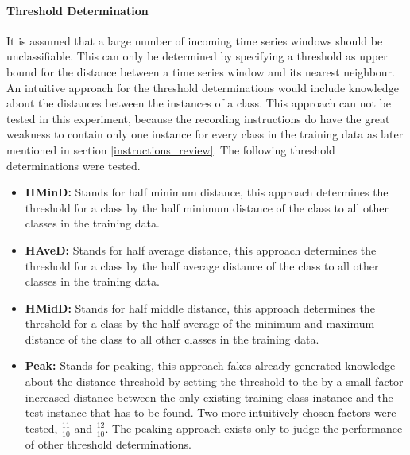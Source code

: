 \paragraph{Threshold Determination} \label{threshold_determination}
It is assumed that a large number of incoming time series windows should be unclassifiable. This can only be determined
by specifying a threshold as upper bound for the distance between a time series window and its nearest neighbour. An
intuitive approach for the threshold determinations would include knowledge about the distances between the instances of
a class. This approach can not be tested in this experiment, because the recording instructions do have the great weakness
to contain only one instance for every class in the training data as later mentioned in section \ref{instructions_review}. The
following threshold determinations were tested.

\begin{itemize}
    \item \textbf{HMinD:} Stands for half minimum distance, this approach determines the threshold for a class by the
        half minimum distance of the class to all other classes in the training data.
    \item \textbf{HAveD:} Stands for half average distance, this approach determines the threshold for a class by the
        half average distance of the class to all other classes in the training data.
    \item \textbf{HMidD:} Stands for half middle distance, this approach determines the threshold for a class by the
        half average of the minimum and maximum distance of the class to all other classes in the training data.
    \item \textbf{Peak:} Stands for peaking, this approach fakes already generated knowledge about the distance
        threshold by setting the threshold to the by a small factor increased distance between the only existing
        training class instance and the test instance that has to be found. Two more intuitively chosen factors were
        tested, $\frac{11}{10}$ and $\frac{12}{10}$. The peaking approach exists only to judge the performance of other
        threshold determinations.
\end{itemize}
